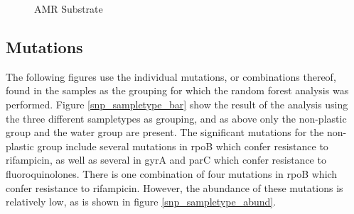 \begin{figure}[h]
    \centering
    \caption{AMR Substrate}
    \label{amr_substrate}
\end{figure}

\subsection{Mutations}
The following figures use the individual mutations, or combinations thereof, found in the samples as the grouping for which the random forest analysis was performed.
Figure \ref{snp_sampletype_bar} show the result of the analysis using the three different sampletypes as grouping, and as above only the non-plastic group and the water group are present. 
The significant mutations for the non-plastic group include several mutations in rpoB which confer resistance to rifampicin, as well as several in gyrA and parC which confer resistance to fluoroquinolones.
There is one combination of four mutations in rpoB which confer resistance to rifampicin. 
However, the abundance of these mutations is relatively low, as is shown in figure \ref{snp_sampletype_abund}.

